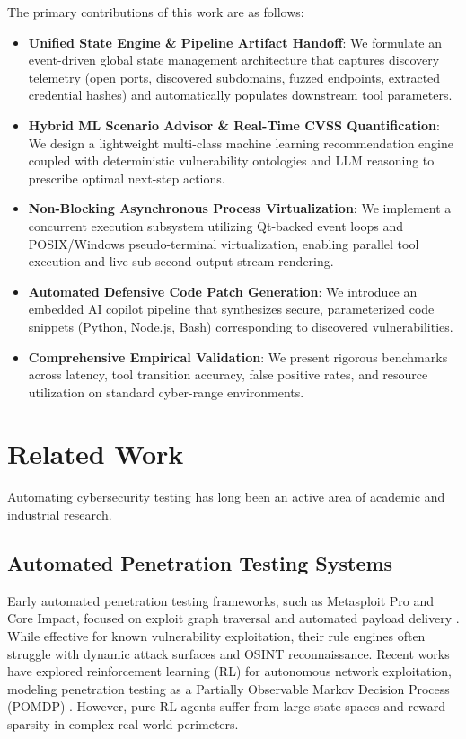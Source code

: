 \documentclass[conference]{IEEEtran}
\begin{document}
The primary contributions of this work are as follows:
\begin{itemize}
    \item \textbf{Unified State Engine \& Pipeline Artifact Handoff}: We formulate an event-driven global state management architecture that captures discovery telemetry (open ports, discovered subdomains, fuzzed endpoints, extracted credential hashes) and automatically populates downstream tool parameters.
    \item \textbf{Hybrid ML Scenario Advisor \& Real-Time CVSS Quantification}: We design a lightweight multi-class machine learning recommendation engine coupled with deterministic vulnerability ontologies and LLM reasoning to prescribe optimal next-step actions.
    \item \textbf{Non-Blocking Asynchronous Process Virtualization}: We implement a concurrent execution subsystem utilizing Qt-backed event loops and POSIX/Windows pseudo-terminal virtualization, enabling parallel tool execution and live sub-second output stream rendering.
    \item \textbf{Automated Defensive Code Patch Generation}: We introduce an embedded AI copilot pipeline that synthesizes secure, parameterized code snippets (Python, Node.js, Bash) corresponding to discovered vulnerabilities.
    \item \textbf{Comprehensive Empirical Validation}: We present rigorous benchmarks across latency, tool transition accuracy, false positive rates, and resource utilization on standard cyber-range environments.
\end{itemize}

\section{Related Work}
Automating cybersecurity testing has long been an active area of academic and industrial research.

\subsection{Automated Penetration Testing Systems}
Early automated penetration testing frameworks, such as Metasploit Pro and Core Impact, focused on exploit graph traversal and automated payload delivery \cite{geffner2015penetration}. While effective for known vulnerability exploitation, their rule engines often struggle with dynamic attack surfaces and OSINT reconnaissance. Recent works have explored reinforcement learning (RL) for autonomous network exploitation, modeling penetration testing as a Partially Observable Markov Decision Process (POMDP) \cite{sarraute2012pomdps, zhou2020autonomous}. However, pure RL agents suffer from large state spaces and reward sparsity in complex real-world perimeters.
\end{document}
